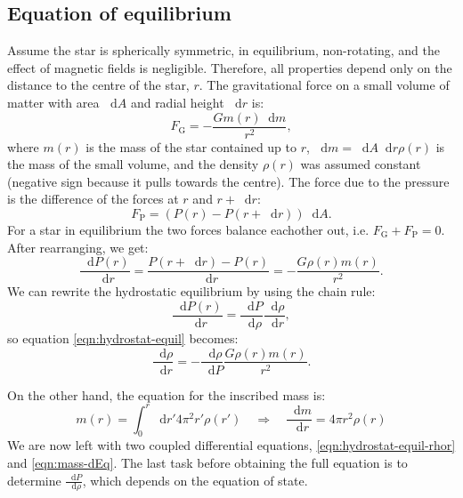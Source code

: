 \documentclass[]{article}
\newcommand{\dd}{\mathop{}\!\mathrm{d}}
\begin{document}
\subsection{Equation of equilibrium}\label{subsec:test}
	Assume the star is spherically symmetric, in equilibrium, non-rotating, and the effect of magnetic fields is negligible. Therefore, all properties depend only on the distance to the centre of the star, $r$. The gravitational force on a small volume of matter with area $\dd A$ and radial height $\dd r$ is:
	\begin{equation}
		F_\mathrm{G} = - \frac{G m\left(r\right) \dd m}{r^2},
	\end{equation}
	where $m\left(r\right)$ is the mass of the star contained up to $r$, $\dd m = \dd A \dd r \rho \left(r\right)$ is the mass of the small volume, and the density $\rho \left(r\right)$ was assumed constant (negative sign because it pulls towards the centre). The force due to the pressure is the difference of the forces at $r$ and $r + \dd r$:
	\begin{equation}
	F_\mathrm{P} = \left( P\left(r\right) - P\left(r + \dd r\right)\right) \dd A.
	\end{equation}
	For a star in equilibrium the two forces balance eachother out, i.e. $F_\mathrm{G} + F_\mathrm{P} = 0$. After rearranging, we get:
	\begin{equation} \label{eqn:hydrostat-equil}
		\frac{\dd P(r)}{\dd r} = \frac{P\left(r + \dd r\right) - P\left(r\right)}{\dd r} = - \frac{G \rho(r) m(r)}{r^2}.
	\end{equation}
	We can rewrite the hydrostatic equilibrium by using the chain rule:
	\begin{equation}
		\frac{\dd P(r)}{\dd r} = \frac{\dd P}{\dd \rho} \frac{\dd \rho}{\dd r},
	\end{equation}
	so equation \eqref{eqn:hydrostat-equil} becomes:
	\begin{equation}\label{eqn:hydrostat-equil-rhor}
		\frac{\dd \rho}{\dd r} = - \frac{\dd \rho}{\dd P} \frac{G \rho(r) m(r)}{r^2}.
	\end{equation}

	On the other hand, the equation for the inscribed mass is:
	\begin{equation}\label{eqn:mass-dEq}
		m(r) = \int_0^r \dd r' 4 \pi^2 r' \rho\left(r'\right) \quad \Rightarrow \quad \frac{\dd m}{\dd r} = 4 \pi r^2 \rho(r)
	\end{equation}
	We are now left with two coupled differential equations, \eqref{eqn:hydrostat-equil-rhor} and \eqref{eqn:mass-dEq}. The last task before obtaining the full equation is to determine $\frac{\dd P}{\dd \rho}$, which depends on the equation of state.
\end{document}
